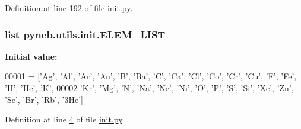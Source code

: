 Definition at line \hyperlink{init_8py_source_l00192}{192} of file \hyperlink{init_8py_source}{init.\-py}.

\hypertarget{namespacepyneb_1_1utils_1_1init_a3c09818249d1b1194ea51949b934e232}{
\subsubsection[{E\-L\-E\-M\-\_\-\-L\-I\-S\-T}]{\setlength{\rightskip}{0pt plus 5cm}list pyneb.\-utils.\-init.\-E\-L\-E\-M\-\_\-\-L\-I\-S\-T}}\label{namespacepyneb_1_1utils_1_1init_a3c09818249d1b1194ea51949b934e232}
{\bfseries Initial value\-:}
\begin{DoxyCode}
\hypertarget{namespacepyneb_1_1utils_1_1init_l00001}{}\hyperlink{namespacepyneb_1_1utils_1_1init}{00001} = [\textcolor{stringliteral}{'Ag'}, \textcolor{stringliteral}{'Al'}, \textcolor{stringliteral}{'Ar'}, \textcolor{stringliteral}{'Au'}, \textcolor{stringliteral}{'B'}, \textcolor{stringliteral}{'Ba'}, \textcolor{stringliteral}{'C'}, \textcolor{stringliteral}{'Ca'}, \textcolor{stringliteral}{'Cl'}, \textcolor{stringliteral}{'Co'}, \textcolor{stringliteral}{'Cr'}, \textcolor{stringliteral}{'Cu'}, \textcolor{stringliteral}{'F'}, \textcolor{stringliteral}{'Fe'}, \textcolor{stringliteral}{'H'}, \textcolor{stringliteral}{'He'}, \textcolor{stringliteral}{'K'},
00002              \textcolor{stringliteral}{'Kr'}, \textcolor{stringliteral}{'Mg'}, \textcolor{stringliteral}{'N'}, \textcolor{stringliteral}{'Na'}, \textcolor{stringliteral}{'Ne'}, \textcolor{stringliteral}{'Ni'}, \textcolor{stringliteral}{'O'}, \textcolor{stringliteral}{'P'}, \textcolor{stringliteral}{'S'}, \textcolor{stringliteral}{'Si'}, \textcolor{stringliteral}{'Xe'}, \textcolor{stringliteral}{'Zn'}, \textcolor{stringliteral}{'Se'}, \textcolor{stringliteral}{'Br'}, \textcolor{stringliteral}{'Rb'}, \textcolor{stringliteral}{'3He'}]
\end{DoxyCode}


Definition at line \hyperlink{init_8py_source_l00004}{4} of file \hyperlink{init_8py_source}{init.\-py}.


